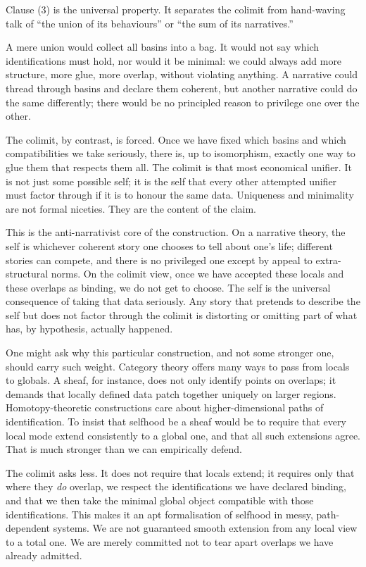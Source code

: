 Clause (3) is the universal property. It separates the colimit from hand-waving talk of ``the union of its behaviours'' or ``the sum of its narratives.''

A mere union would collect all basins into a bag. It would not say which identifications must hold, nor would it be minimal: we could always add more structure, more glue, more overlap, without violating anything. A narrative could thread through basins and declare them coherent, but another narrative could do the same differently; there would be no principled reason to privilege one over the other.

The colimit, by contrast, is forced. Once we have fixed which basins and which compatibilities we take seriously, there is, up to isomorphism, exactly one way to glue them that respects them all. The colimit is that most economical unifier. It is not just some possible self; it is the self that every other attempted unifier must factor through if it is to honour the same data. Uniqueness and minimality are not formal niceties. They are the content of the claim.

This is the anti-narrativist core of the construction. On a narrative theory, the self is whichever coherent story one chooses to tell about one's life; different stories can compete, and there is no privileged one except by appeal to extra-structural norms. On the colimit view, once we have accepted these locals and these overlaps as binding, we do not get to choose. The self is the universal consequence of taking that data seriously. Any story that pretends to describe the self but does not factor through the colimit is distorting or omitting part of what has, by hypothesis, actually happened.

One might ask why this particular construction, and not some stronger one, should carry such weight. Category theory offers many ways to pass from locals to globals. A sheaf, for instance, does not only identify points on overlaps; it demands that locally defined data patch together uniquely on larger regions. Homotopy-theoretic constructions care about higher-dimensional paths of identification. To insist that selfhood be a sheaf would be to require that every local mode extend consistently to a global one, and that all such extensions agree. That is much stronger than we can empirically defend.

The colimit asks less. It does not require that locals extend; it requires only that where they \emph{do} overlap, we respect the identifications we have declared binding, and that we then take the minimal global object compatible with those identifications. This makes it an apt formalisation of selfhood in messy, path-dependent systems. We are not guaranteed smooth extension from any local view to a total one. We are merely committed not to tear apart overlaps we have already admitted.

